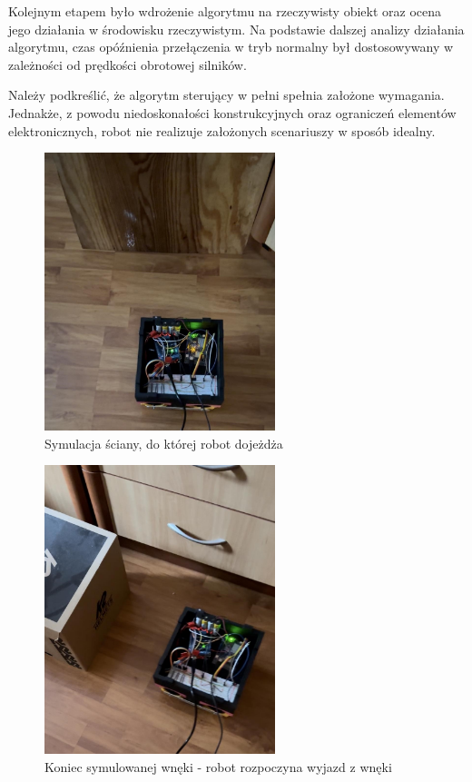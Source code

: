 \documentclass{report}
\begin{document}
Kolejnym etapem było wdrożenie algorytmu na rzeczywisty obiekt oraz ocena jego działania w środowisku rzeczywistym. Na podstawie dalszej analizy działania algorytmu, czas opóźnienia przełączenia w tryb normalny był dostosowywany w zależności od prędkości obrotowej silników.

Należy podkreślić, że algorytm sterujący w pełni spełnia założone wymagania. Jednakże, z powodu niedoskonałości konstrukcyjnych oraz ograniczeń elementów elektronicznych, robot nie realizuje założonych scenariuszy w sposób idealny.

\begin{figure}[H]
\centering
\includegraphics[width=0.6\textwidth]{src/Robot_pics/test1.jpg}
\caption{Symulacja ściany, do której robot dojeżdża}
\end{figure}

\begin{figure}[H]
\centering
\includegraphics[width=0.6\textwidth]{src/Robot_pics/test2.jpg}
\caption{Koniec symulowanej wnęki - robot rozpoczyna wyjazd z wnęki}
\end{figure}
\end{document}
